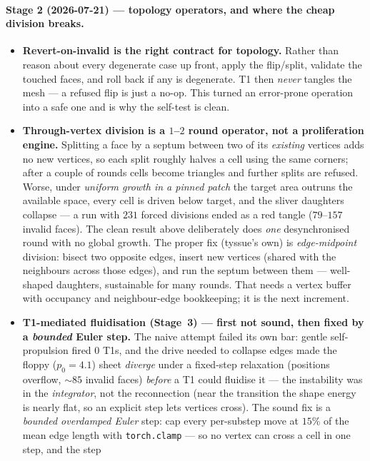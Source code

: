 \documentclass[11pt]{article}
\begin{document}
\paragraph{Stage 2 (2026-07-21) --- topology operators, and where the cheap division breaks.}
\begin{itemize}\itemsep2pt
\item \textbf{Revert-on-invalid is the right contract for topology.} Rather than reason about
every degenerate case up front, apply the flip/split, validate the touched faces, and roll back if
any is degenerate. T1 then \emph{never} tangles the mesh --- a refused flip is just a no-op. This
turned an error-prone operation into a safe one and is why the self-test is clean.
\item \textbf{Through-vertex division is a $1$--$2$ round operator, not a proliferation engine.}
Splitting a face by a septum between two of its \emph{existing} vertices adds no new vertices, so
each split roughly halves a cell using the same corners; after a couple of rounds cells become
triangles and further splits are refused. Worse, under \emph{uniform growth in a pinned patch} the
target area outruns the available space, every cell is driven below target, and the sliver
daughters collapse --- a run with $231$ forced divisions ended as a red tangle
($79$--$157$ invalid faces). The clean result above deliberately does \emph{one} desynchronised
round with no global growth. The proper fix (tyssue's own) is \emph{edge-midpoint} division:
bisect two opposite edges, insert new vertices (shared with the neighbours across those edges), and
run the septum between them --- well-shaped daughters, sustainable for many rounds. That needs a
vertex buffer with occupancy and neighbour-edge bookkeeping; it is the next increment.
\item \textbf{T1-mediated fluidisation (Stage~3) --- first not sound, then fixed by a \emph{bounded}
Euler step.} The naive attempt failed its own bar: gentle self-propulsion fired $0$ T1s, and the
drive needed to collapse edges made the floppy ($p_0\!=\!4.1$) sheet \emph{diverge} under a
fixed-step relaxation (positions overflow, $\sim\!85$ invalid faces) \emph{before} a T1 could
fluidise it --- the instability was in the \emph{integrator}, not the reconnection (near the
transition the shape energy is nearly flat, so an explicit step lets vertices cross). The sound
fix is a \emph{bounded overdamped Euler} step: cap every per-substep move at $15\%$ of the mean
edge length with \texttt{torch.clamp} --- so no vertex can cross a cell in one step, and the step

\end{itemize}
\end{document}
